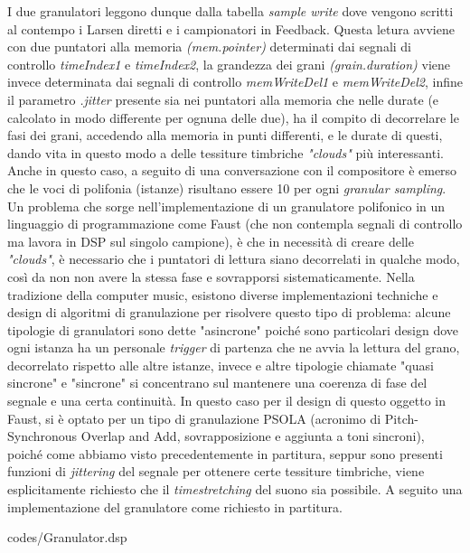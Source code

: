 I due granulatori leggono dunque dalla tabella \textit{sample write} dove vengono scritti
al contempo i Larsen diretti e i campionatori in Feedback. 
Questa letura avviene con due puntatori alla memoria \textit{(mem.pointer)} determinati 
dai segnali di controllo \textit{timeIndex1} e \textit{timeIndex2}, la grandezza dei grani 
\textit{(grain.duration)} viene invece determinata dai segnali di controllo 
\textit{memWriteDel1} e \textit{memWriteDel2}, infine il parametro \textit{.jitter}
presente sia nei puntatori alla memoria che nelle durate (e calcolato in modo differente per ognuna delle due),
ha il compito di decorrelare le fasi dei grani, accedendo alla memoria in punti differenti,
e le durate di questi, dando vita in questo modo a delle tessiture timbriche \textit{"clouds"} più interessanti.
Anche in questo caso, a seguito di una conversazione con il compositore è emerso che le voci di polifonia
(istanze) risultano essere 10 per ogni \textit{granular sampling}.
Un problema che sorge nell'implementazione di un granulatore polifonico in un linguaggio di 
programmazione come Faust (che non contempla segnali di controllo ma lavora in DSP sul singolo campione),
è che in necessità di creare delle \textit{"clouds"}, è necessario che i puntatori di lettura
siano decorrelati in qualche modo, così da non non avere la stessa fase e sovrapporsi sistematicamente.
Nella tradizione della computer music, esistono diverse implementazioni techniche e design 
di algoritmi di granulazione per risolvere questo tipo di problema:
alcune tipologie di granulatori sono dette "asincrone" poiché sono particolari design dove
ogni istanza ha un personale \textit{trigger} 
di partenza che ne avvia la lettura del grano, decorrelato rispetto alle altre istanze,
invece e altre tipologie chiamate "quasi sincrone" e "sincrone" si concentrano sul mantenere
una coerenza di fase del segnale e una certa continuità.
In questo caso per il design di questo oggetto in Faust, si è optato per un tipo di granulazione
PSOLA (acronimo di Pitch-Synchronous Overlap and Add, sovrapposizione e aggiunta a toni sincroni), 
poiché come abbiamo visto precedentemente in partitura, 
seppur sono presenti funzioni di \textit{jittering} del segnale
per ottenere certe tessiture timbriche, viene esplicitamente richiesto
che il \textit{timestretching} del suono sia possibile. 
A seguito una implementazione del granulatore come richiesto in partitura.

\vspace{0.5cm} 

{codes/Granulator.dsp}


